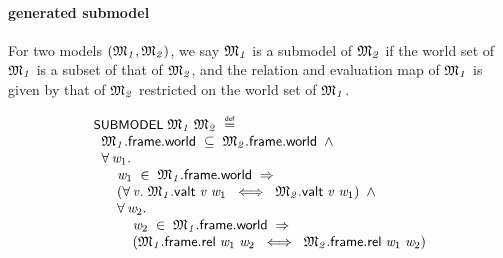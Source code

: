 \documentclass{report}
\renewcommand{\HOLConst}[1]{{\textsf{\upshape\small #1}}}
\renewcommand{\HOLinline}[1]{\ensuremath{#1}}
\newenvironment{holmath}{\begin{displaymath}\begin{array}{l}}{\end{array}\end{displaymath}\ignorespacesafterend}
\begin{document}
\paragraph{generated submodel}

For two models \HOLinline{(\HOLFreeVar{\ensuremath{\mathfrak{M}\sb{1}}}\HOLSymConst{,}\HOLFreeVar{\ensuremath{\mathfrak{M}\sb{2}}})}, we say \HOLinline{\HOLFreeVar{\ensuremath{\mathfrak{M}\sb{1}}}} is a submodel of \HOLinline{\HOLFreeVar{\ensuremath{\mathfrak{M}\sb{2}}}} if the world set of \HOLinline{\HOLFreeVar{\ensuremath{\mathfrak{M}\sb{1}}}} is a subset of that of \HOLinline{\HOLFreeVar{\ensuremath{\mathfrak{M}\sb{2}}}}, and the relation and evaluation map of \HOLinline{\HOLFreeVar{\ensuremath{\mathfrak{M}\sb{1}}}} is given by that of \HOLinline{\HOLFreeVar{\ensuremath{\mathfrak{M}\sb{2}}}} restricted on the world set of \HOLinline{\HOLFreeVar{\ensuremath{\mathfrak{M}\sb{1}}}}.

\begin{holmath}
  \HOLConst{SUBMODEL}\;\HOLFreeVar{\ensuremath{\mathfrak{M}\sb{1}}}\;\HOLFreeVar{\ensuremath{\mathfrak{M}\sb{2}}}\;\HOLSymConst{\HOLTokenDefEquality{}}\\
\;\;\HOLFreeVar{\ensuremath{\mathfrak{M}\sb{1}}}.\HOLFieldName{frame}.\HOLFieldName{world}\;\HOLSymConst{\HOLTokenSubset{}}\;\HOLFreeVar{\ensuremath{\mathfrak{M}\sb{2}}}.\HOLFieldName{frame}.\HOLFieldName{world}\;\HOLSymConst{\HOLTokenConj{}}\\
\;\;\HOLSymConst{\HOLTokenForall{}}\HOLBoundVar{w\sb{\mathrm{1}}}.\\
\;\;\;\;\;\;\HOLBoundVar{w\sb{\mathrm{1}}}\;\HOLSymConst{\HOLTokenIn{}}\;\HOLFreeVar{\ensuremath{\mathfrak{M}\sb{1}}}.\HOLFieldName{frame}.\HOLFieldName{world}\;\HOLSymConst{\HOLTokenImp{}}\\
\;\;\;\;\;\;(\HOLSymConst{\HOLTokenForall{}}\HOLBoundVar{v}.\;\HOLFreeVar{\ensuremath{\mathfrak{M}\sb{1}}}.\HOLFieldName{valt}\;\HOLBoundVar{v}\;\HOLBoundVar{w\sb{\mathrm{1}}}\;\HOLSymConst{\HOLTokenEquiv{}}\;\HOLFreeVar{\ensuremath{\mathfrak{M}\sb{2}}}.\HOLFieldName{valt}\;\HOLBoundVar{v}\;\HOLBoundVar{w\sb{\mathrm{1}}})\;\HOLSymConst{\HOLTokenConj{}}\\
\;\;\;\;\;\;\HOLSymConst{\HOLTokenForall{}}\HOLBoundVar{w\sb{\mathrm{2}}}.\\
\;\;\;\;\;\;\;\;\;\;\HOLBoundVar{w\sb{\mathrm{2}}}\;\HOLSymConst{\HOLTokenIn{}}\;\HOLFreeVar{\ensuremath{\mathfrak{M}\sb{1}}}.\HOLFieldName{frame}.\HOLFieldName{world}\;\HOLSymConst{\HOLTokenImp{}}\\
\;\;\;\;\;\;\;\;\;\;(\HOLFreeVar{\ensuremath{\mathfrak{M}\sb{1}}}.\HOLFieldName{frame}.\HOLFieldName{rel}\;\HOLBoundVar{w\sb{\mathrm{1}}}\;\HOLBoundVar{w\sb{\mathrm{2}}}\;\HOLSymConst{\HOLTokenEquiv{}}\;\HOLFreeVar{\ensuremath{\mathfrak{M}\sb{2}}}.\HOLFieldName{frame}.\HOLFieldName{rel}\;\HOLBoundVar{w\sb{\mathrm{1}}}\;\HOLBoundVar{w\sb{\mathrm{2}}})
\end{holmath}
\end{document}

